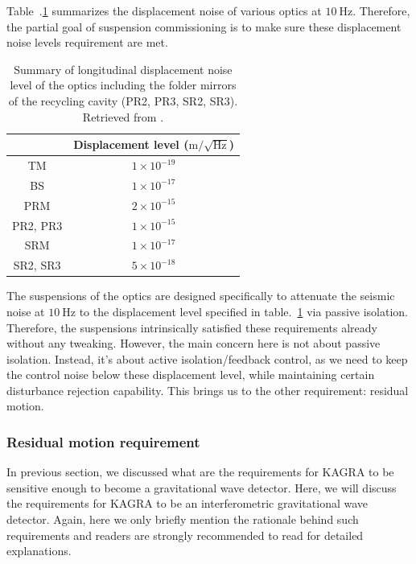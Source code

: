 Table~.\ref{table:displacement_noise_requirement} summarizes the displacement noise of various optics at $10~\mathrm{Hz}$.
Therefore, the partial goal of suspension commissioning is to make sure these displacement noise levels requirement are met.
\begin{table}[!h]
	\centering
	\begin{tabular}{|c|c|}
		\hline
		& Displacement level ($\mathrm{m}/\sqrt{\mathrm{Hz}}$)\\
		\hline
		TM &  $1\times 10^{-19}$\\
		\hline
		BS &  $1\times 10^{-17}$\\
		\hline
		PRM & $2\times 10^{-15}$\\
		\hline
		PR2, PR3 & $1\times 10^{-15}$\\
		\hline
		SRM & $1\times 10^{-17}$\\
		\hline
		SR2, SR3 & $5\times 10^{-18}$\\
		\hline
	\end{tabular}
	\caption{Summary of longitudinal displacement noise level of the optics including the folder mirrors of the recycling cavity (PR2, PR3, SR2, SR3). Retrieved from \cite{Sekiguchi:2016bmv}.}
	\label{table:displacement_noise_requirement}
\end{table}
The suspensions of the optics are designed specifically to attenuate the seismic noise at $10~\mathrm{Hz}$ to the displacement level specified in table.~\ref{table:displacement_noise_requirement} via passive isolation.
Therefore, the suspensions intrinsically satisfied these requirements already without any tweaking.
However, the main concern here is not about passive isolation.
Instead, it's about active isolation/feedback control, as we need to keep the control noise below these displacement level, while maintaining certain disturbance rejection capability.
This brings us to the other requirement: residual motion.

\subsubsection{Residual motion requirement}
In previous section, we discussed what are the requirements for KAGRA to be sensitive enough to become a gravitational wave detector.
Here, we will discuss the requirements for KAGRA to be an interferometric gravitational wave detector.
Again, here we only briefly mention the rationale behind such requirements and readers are strongly recommended to read \cite{Sekiguchi:2016bmv} for detailed explanations.

